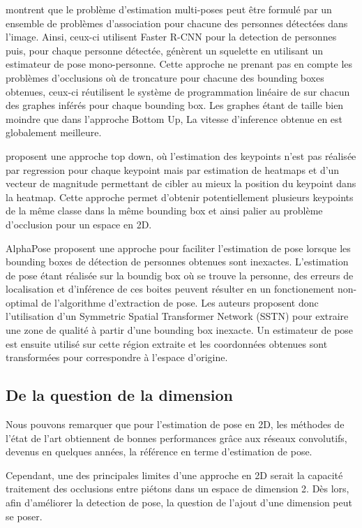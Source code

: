 \cite{2016arXiv160808526I} montrent que le problème d'estimation multi-poses peut être formulé par un ensemble de problèmes d'association pour chacune des personnes détectées dans l'image. Ainsi, ceux-ci utilisent Faster R-CNN pour la detection de personnes puis, pour chaque personne détectée, génèrent un squelette en utilisant un estimateur de pose mono-personne. Cette approche ne prenant pas en compte les problèmes d'occlusions où de troncature pour chacune des bounding boxes obtenues, ceux-ci réutilisent le système de programmation linéaire de \cite{2015arXiv151106645P} sur chacun des graphes inférés pour chaque bounding box. Les graphes étant de taille bien moindre que dans l'approche Bottom Up, La vitesse d'inference obtenue en est globalement meilleure.

\cite{2017arXiv170101779P} proposent une approche top down, où l'estimation des keypoints n'est pas réalisée par regression pour chaque keypoint mais par estimation de heatmaps et d'un vecteur de magnitude permettant de cibler au mieux la position du keypoint dans la heatmap. Cette approche permet d'obtenir potentiellement plusieurs keypoints de la même classe dans la même bounding box et ainsi palier au problème d'occlusion pour un espace en 2D. 

AlphaPose \cite{fang2017rmpe} proposent une approche pour faciliter l'estimation de pose lorsque les bounding boxes de détection de personnes obtenues sont inexactes. L'estimation de pose étant réalisée sur la boundig box où se trouve la personne, des erreurs de localisation et d'inférence de ces boites peuvent résulter en un fonctionement non-optimal de l'algorithme d'extraction de pose. Les auteurs proposent donc l'utilisation d'un Symmetric Spatial Transformer Network (SSTN) pour extraire une zone de qualité à partir d'une bounding box inexacte. Un estimateur de pose est ensuite utilisé sur cette région extraite et les coordonnées obtenues sont transformées pour correspondre à l'espace d'origine.


\subsection{De la question de la dimension}
Nous pouvons remarquer que pour l'estimation de pose en 2D, les méthodes de l'état de l'art obtiennent de bonnes performances grâce aux réseaux convolutifs, devenus en quelques années, la référence en terme d'estimation de pose.

Cependant, une des principales limites d'une approche en 2D serait la capacité traitement des occlusions entre piétons dans un espace de dimension 2. Dès lors, afin d'améliorer la detection de pose, la question de l'ajout d'une dimension peut se poser.

